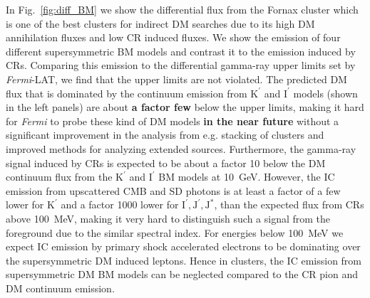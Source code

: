 \documentclass[10pt,aps,pra,reprint,amsmath,amsfonts,amssymb,showpacs,nofootinbib,floatfix]{revtex4-1}
\def\C#1{{\bf #1}}
\newcommand{\Fermi}{{\em Fermi}\xspace}
\newcommand{\rmn}{\mathrm}
\newcommand{\Kp}{\rmn{K}^\prime}
\newcommand{\Ip}{\rmn{I}^\prime}
\newcommand{\Js}{\rmn{J}^*}
\newcommand{\Jp}{\rmn{J}^\prime}
\begin{document}
In Fig.~\ref{fig:diff_BM} we show the differential flux from the
Fornax cluster which is one of the best clusters for indirect DM
searches due to its high DM annihilation fluxes and low CR induced
fluxes. We show the emission of four different supersymmetric BM
models and contrast it to the emission induced by CRs. Comparing this
emission to the differential gamma-ray upper limits set by \Fermi-LAT,
we find that the upper limits are not violated. The predicted DM flux
that is dominated by the continuum emission from $\Kp$ and $\Ip$
models (shown in the left panels) are about \C{a factor few} below the
upper limits, making it hard for \Fermi to probe these kind of DM
models \C{in the near future} without a significant improvement in the
analysis from e.g. stacking of clusters and improved methods for
analyzing extended sources. Furthermore, the gamma-ray signal induced
by CRs is expected to be about a factor 10 below the DM continuum
flux from the $\Kp$ and $\Ip$ BM models at 10~GeV. However, the IC
emission from upscattered CMB and SD photons is at least a factor of a
few lower for $\Kp$ and a factor 1000 lower for $\Ip,\Jp,\Js$, than
the expected flux from CRs above 100~MeV, making it very hard to
distinguish such a signal from the foreground due to the similar
spectral index. For energies below 100~MeV we expect IC emission by
primary shock accelerated electrons to be dominating
\cite{2010MNRAS.409..449P} over the supersymmetric DM induced
leptons. Hence in clusters, the IC emission from supersymmetric DM BM
models can be neglected compared to the CR pion and DM continuum
emission.
\end{document}
